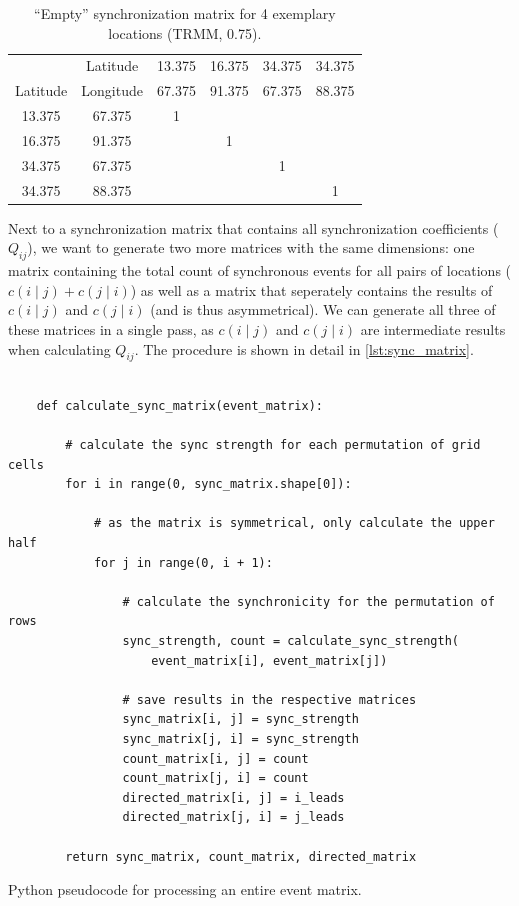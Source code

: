 \begin{table}[h]
  \centering
  \begin{tabular}{ |cc|cccc| }
    \hline
     & Latitude & 13.375 & 16.375 & 34.375 & 34.375 \\
    Latitude & Longitude & 67.375 & 91.375 & 67.375 & 88.375 \\
    \hline
    13.375 & 67.375 & 1 &   &   &   \\
    16.375 & 91.375 &   & 1 &   &   \\
    34.375 & 67.375 &   &   & 1 &   \\
    34.375 & 88.375 &   &   &   & 1 \\
    \hline
  \end{tabular}
  \caption{``Empty'' synchronization matrix for 4 exemplary locations (TRMM, 0.75\degree).}
  \label{tab:example_empty_sync}
\end{table}

Next to a synchronization matrix that contains all synchronization coefficients ($Q_{ij}$), we want to generate two more matrices with the same dimensions: one matrix containing the total count of synchronous events for all pairs of locations ($c(i \mid j) + c(j \mid i)$) as well as a matrix that seperately contains the results of $c(i \mid j)$ and $c(j \mid i)$ (and is thus asymmetrical). We can generate all three of these matrices in a single pass, as $c(i \mid j)$ and $c(j \mid i)$ are intermediate results when calculating $Q_{ij}$. The procedure is shown in detail in \cref{lst:sync_matrix}.

\begin{listing}[h]
  \begin{verbatim}

    def calculate_sync_matrix(event_matrix):

        # calculate the sync strength for each permutation of grid cells
        for i in range(0, sync_matrix.shape[0]):

            # as the matrix is symmetrical, only calculate the upper half
            for j in range(0, i + 1):

                # calculate the synchronicity for the permutation of rows
                sync_strength, count = calculate_sync_strength(
                    event_matrix[i], event_matrix[j])

                # save results in the respective matrices
                sync_matrix[i, j] = sync_strength
                sync_matrix[j, i] = sync_strength
                count_matrix[i, j] = count
                count_matrix[j, i] = count
                directed_matrix[i, j] = i_leads
                directed_matrix[j, i] = j_leads

        return sync_matrix, count_matrix, directed_matrix

  \end{verbatim}
  \caption{Python pseudocode for processing an entire event matrix.}
  \label{lst:sync_matrix}
\end{listing}


